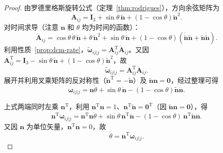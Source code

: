 \begin{proof}
	由罗德里格斯旋转公式（定理~\ref{thm:rodrigues}），方向余弦矩阵为
	$$
	\boldsymbol{A}_{ij}=\boldsymbol{I}_3+\sin\theta\,\tilde{\boldsymbol{n}}+(1-\cos\theta)\tilde{\boldsymbol{n}}^2.
	$$
	对时间求导（注意 $\boldsymbol{n}$ 和 $\theta$ 均为时间的函数）：
	$$
	\dot{\boldsymbol{A}}_{ij}=\cos\theta\,\dot{\theta}\,\tilde{\boldsymbol{n}}+\dot{\theta}\,\tilde{\boldsymbol{n}}^2+\sin\theta\,\dot{\tilde{\boldsymbol{n}}}+(1-\cos\theta)\left(\dot{\tilde{\boldsymbol{n}}}\tilde{\boldsymbol{n}}+\tilde{\boldsymbol{n}}\dot{\tilde{\boldsymbol{n}}}\right).
	$$
	利用性质~\ref{prop:dcm-rate}，$\tilde{\boldsymbol{\omega}}_{ij|j}=\boldsymbol{A}_{ij}^{\mathrm{T}}\dot{\boldsymbol{A}}_{ij}$。又因 $\boldsymbol{A}_{ij}^{\mathrm{T}}=\boldsymbol{I}_3-\sin\theta\,\tilde{\boldsymbol{n}}+(1-\cos\theta)\tilde{\boldsymbol{n}}^2$，故
	$$
	\tilde{\boldsymbol{\omega}}_{ij|j}=\boldsymbol{A}_{ij}^{\mathrm{T}}\dot{\boldsymbol{A}}_{ij}.
	$$
	展开并利用叉乘矩阵的反对称性（$\tilde{\boldsymbol{n}}^{\mathrm{T}}=-\tilde{\boldsymbol{n}}$）及 $\tilde{\boldsymbol{n}}\boldsymbol{n}=\boldsymbol{0}$，经过整理可得
	$$
	\boldsymbol{\omega}_{ij|j}=\boldsymbol{n}\dot{\theta}+\sin\theta\,\dot{\boldsymbol{n}}-(1-\cos\theta)\tilde{\boldsymbol{n}}\dot{\boldsymbol{n}}.
	$$

	上式两端同时左乘 $\boldsymbol{n}^{\mathrm{T}}$，利用 $\boldsymbol{n}^{\mathrm{T}}\boldsymbol{n}=1$、$\boldsymbol{n}^{\mathrm{T}}\tilde{\boldsymbol{n}}=\boldsymbol{0}^{\mathrm{T}}$（因 $\tilde{\boldsymbol{n}}\boldsymbol{n}=\boldsymbol{0}$），得
	$$
	\boldsymbol{n}^{\mathrm{T}}\boldsymbol{\omega}_{ij|j}=\boldsymbol{n}^{\mathrm{T}}\boldsymbol{n}\dot{\theta}+\sin\theta\,\boldsymbol{n}^{\mathrm{T}}\dot{\boldsymbol{n}}-(1-\cos\theta)\,\boldsymbol{n}^{\mathrm{T}}\tilde{\boldsymbol{n}}\dot{\boldsymbol{n}}.
	$$
	又因 $\boldsymbol{n}$ 为单位矢量，$\boldsymbol{n}^{\mathrm{T}}\dot{\boldsymbol{n}}=0$，故
	$$
	\dot{\theta}=\boldsymbol{n}^{\mathrm{T}}\boldsymbol{\omega}_{ij|j}.
	$$


\end{proof}
